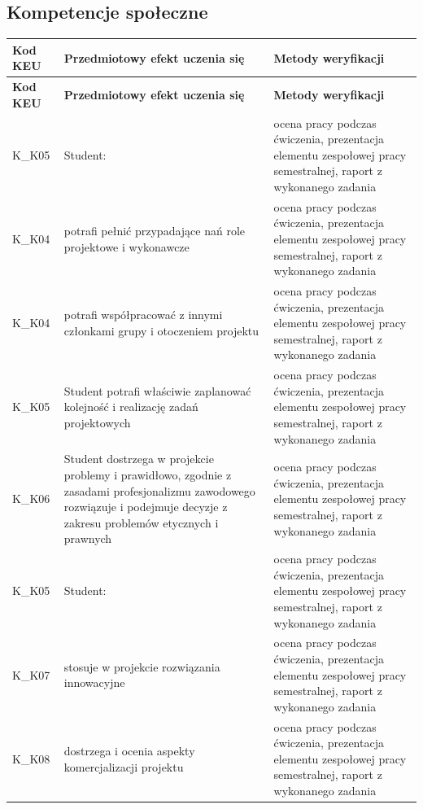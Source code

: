 \documentclass[12pt, a4paper]{article}
\newcommand{\thdrule}{\noalign{\global\setlength{\extrarowheight}{0pt}}}
\newcommand{\thdend}{\noalign{\global\setlength{\extrarowheight}{3pt}}}
\begin{document}
\subsection*{Kompetencje społeczne}
{\scriptsize
\begin{longtable}{m{1.6cm}m{9.0cm}m{4.2cm}}
\thdrule\toprule
\rowcolor{pjatkRed} {\color{white}\footnotesize\textbf{\vphantom{Ag}Kod KEU}} & {\color{white}\footnotesize\textbf{\vphantom{Ag}Przedmiotowy efekt uczenia się}} & {\color{white}\footnotesize\textbf{\vphantom{Ag}Metody weryfikacji}} \\
\midrule\thdend
\endfirsthead
\thdrule\toprule
\rowcolor{pjatkRed} {\color{white}\footnotesize\textbf{\vphantom{Ag}Kod KEU}} & {\color{white}\footnotesize\textbf{\vphantom{Ag}Przedmiotowy efekt uczenia się}} & {\color{white}\footnotesize\textbf{\vphantom{Ag}Metody weryfikacji}} \\
\midrule\thdend
\endhead
  \rowcolor{tableRowLight} K\_K05 & Student: & ocena pracy podczas ćwiczenia, prezentacja elementu zespołowej pracy semestralnej, raport z wykonanego zadania \\
  \rowcolor{tableRowAlt} K\_K04 & potrafi pełnić przypadające nań role projektowe i wykonawcze & ocena pracy podczas ćwiczenia, prezentacja elementu zespołowej pracy semestralnej, raport z wykonanego zadania \\
  \rowcolor{tableRowLight} K\_K04 & potrafi współpracować z innymi członkami grupy i otoczeniem projektu & ocena pracy podczas ćwiczenia, prezentacja elementu zespołowej pracy semestralnej, raport z wykonanego zadania \\
  \rowcolor{tableRowAlt} K\_K05 & Student potrafi właściwie zaplanować kolejność i realizację zadań projektowych & ocena pracy podczas ćwiczenia, prezentacja elementu zespołowej pracy semestralnej, raport z wykonanego zadania \\
  \rowcolor{tableRowLight} K\_K06 & Student dostrzega w projekcie problemy i prawidłowo, zgodnie z zasadami profesjonalizmu zawodowego rozwiązuje i podejmuje decyzje z zakresu problemów etycznych i prawnych & ocena pracy podczas ćwiczenia, prezentacja elementu zespołowej pracy semestralnej, raport z wykonanego zadania \\
  \rowcolor{tableRowAlt} K\_K05 & Student: & ocena pracy podczas ćwiczenia, prezentacja elementu zespołowej pracy semestralnej, raport z wykonanego zadania \\
  \rowcolor{tableRowLight} K\_K07 & stosuje w projekcie rozwiązania innowacyjne & ocena pracy podczas ćwiczenia, prezentacja elementu zespołowej pracy semestralnej, raport z wykonanego zadania \\
  \rowcolor{tableRowAlt} K\_K08 & dostrzega i ocenia aspekty komercjalizacji projektu & ocena pracy podczas ćwiczenia, prezentacja elementu zespołowej pracy semestralnej, raport z wykonanego zadania \\
\bottomrule
\end{longtable}}
\end{document}
